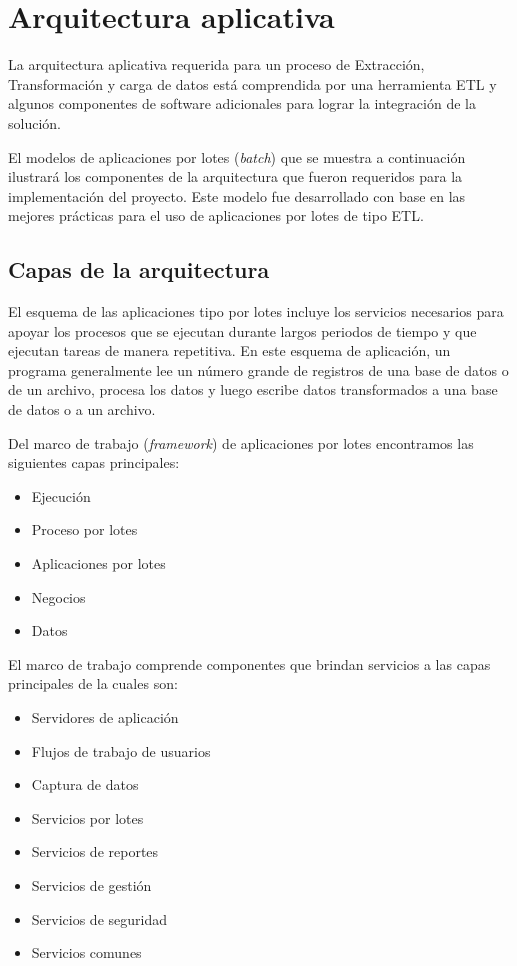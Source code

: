 \section{Arquitectura aplicativa}

La arquitectura aplicativa requerida para un proceso de Extracción,
Transformación y carga de datos está comprendida por una herramienta ETL y
algunos componentes de software adicionales para lograr la integración de la
solución.

El modelos de aplicaciones por lotes (\emph{batch}) que se muestra a
continuación ilustrará los componentes de la arquitectura que fueron requeridos
para la implementación del proyecto. Este modelo fue desarrollado con base en
las mejores prácticas para el uso de aplicaciones por lotes de tipo ETL.

\subsection{Capas de la arquitectura}

El esquema de las aplicaciones tipo por lotes incluye los servicios necesarios para
apoyar los procesos que se ejecutan durante largos periodos de tiempo y que
ejecutan tareas de manera repetitiva. En este esquema de aplicación, un programa
generalmente lee un número grande de registros de una base de datos o de un
archivo, procesa los datos y luego escribe datos transformados a una base de
datos o a un archivo.

Del marco de trabajo (\emph{framework}) de aplicaciones por lotes encontramos
las siguientes capas principales:

\begin{itemize}
\item Ejecución
\item Proceso por lotes
\item Aplicaciones por lotes
\item Negocios
\item Datos
\end{itemize}

El marco de trabajo comprende componentes que brindan servicios a las capas principales de la cuales son:

\begin{itemize}
\item Servidores de aplicación
\item Flujos de trabajo de usuarios
\item Captura de datos
\item Servicios por lotes
\item Servicios de reportes
\item Servicios de gestión
\item Servicios de seguridad
\item Servicios comunes
\end{itemize}

